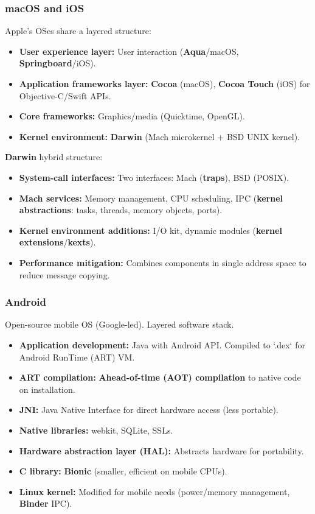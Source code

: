 \subsubsection*{macOS and iOS}
Apple's OSes share a layered structure:
\begin{itemize}
    \item \textbf{User experience layer:} User interaction (\textbf{Aqua}/macOS, \textbf{Springboard}/iOS).
    \item \textbf{Application frameworks layer:} \textbf{Cocoa} (macOS), \textbf{Cocoa Touch} (iOS) for Objective-C/Swift APIs.
    \item \textbf{Core frameworks:} Graphics/media (Quicktime, OpenGL).
    \item \textbf{Kernel environment:} \textbf{Darwin} (Mach microkernel + BSD UNIX kernel).
\end{itemize}
\textbf{Darwin} hybrid structure:
\begin{itemize}
    \item \textbf{System-call interfaces:} Two interfaces: Mach (\textbf{traps}), BSD (POSIX).
    \item \textbf{Mach services:} Memory management, CPU scheduling, IPC (\textbf{kernel abstractions}: tasks, threads, memory objects, ports).
    \item \textbf{Kernel environment additions:} I/O kit, dynamic modules (\textbf{kernel extensions}/\textbf{kexts}).
    \item \textbf{Performance mitigation:} Combines components in single address space to reduce message copying.
\end{itemize}

\subsubsection*{Android}
Open-source mobile OS (Google-led). Layered software stack.
\begin{itemize}
    \item \textbf{Application development:} Java with Android API. Compiled to `.dex` for Android RunTime (ART) VM.
    \item \textbf{ART compilation:} \textbf{Ahead-of-time (AOT) compilation} to native code on installation.
    \item \textbf{JNI:} Java Native Interface for direct hardware access (less portable).
    \item \textbf{Native libraries:} webkit, SQLite, SSLs.
    \item \textbf{Hardware abstraction layer (HAL):} Abstracts hardware for portability.
    \item \textbf{C library:} \textbf{Bionic} (smaller, efficient on mobile CPUs).
    \item \textbf{Linux kernel:} Modified for mobile needs (power/memory management, \textbf{Binder} IPC).
\end{itemize}


